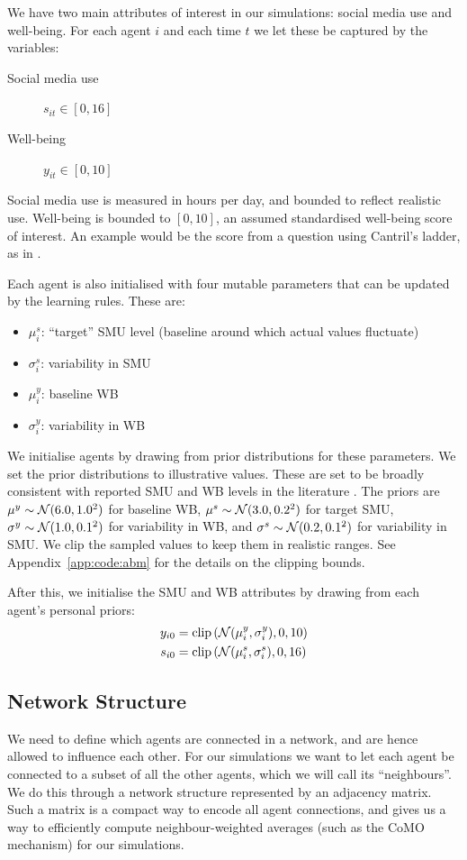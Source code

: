 We have two main attributes of interest in our simulations: social media use and well-being. For each agent $i$ and each time $t$ we let these be captured by the variables:

\begin{description}
    \item[Social media use] $s_{it} \in [0, 16]$
    \item[Well-being] $y_{it} \in [0, 10]$
\end{description}

Social media use is measured in hours per day, and bounded to reflect realistic use. Well-being is bounded to $[0, 10]$, an assumed standardised well-being score of interest. An example would be the score from a question using Cantril's ladder, as in \textcite[p.~22]{Cantril1965}.

Each agent is also initialised with four mutable parameters that can be updated by the learning rules. These are:
\begin{itemize}
    \item $\mu^s_i$: ``target'' SMU level (baseline around which actual values fluctuate)
    \item $\sigma^s_i$: variability in SMU
    \item $\mu^y_i$: baseline WB
    \item $\sigma^y_i$: variability in WB
\end{itemize}

We initialise agents by drawing from prior distributions for these parameters. We set the prior distributions to illustrative values. These are set to be broadly consistent with reported SMU and WB levels in the literature \parencite{Twenge2018, Valkenburg2022}. The priors are $\mu^y \sim \mathcal{N}(6.0, 1.0^2)$ for baseline WB, $\mu^s \sim \mathcal{N}(3.0, 0.2^2)$ for target SMU, $\sigma^y \sim \mathcal{N}(1.0, 0.1^2)$ for variability in WB, and $\sigma^s \sim \mathcal{N}(0.2, 0.1^2)$ for variability in SMU\@. We clip the sampled values to keep them in realistic ranges. See Appendix~\ref{app:code:abm} for the details on the clipping bounds.

After this, we initialise the SMU and WB attributes by drawing from each agent's personal priors:
\begin{align}
y_{i0} &= \text{clip}\left(\mathcal{N}(\mu^y_i, \sigma^y_i), 0, 10\right) \\
s_{i0} &= \text{clip}\left(\mathcal{N}(\mu^s_i, \sigma^s_i), 0, 16\right)
\end{align}

\subsection{Network Structure}
\label{sec:abm:network}
We need to define which agents are connected in a network, and are hence allowed to influence each other. For our simulations we want to let each agent be connected to a subset of all the other agents, which we will call its ``neighbours''. We do this through a network structure represented by an adjacency matrix. Such a matrix is a compact way to encode all agent connections, and gives us a way to efficiently compute neighbour-weighted averages (such as the CoMO mechanism) for our simulations.

